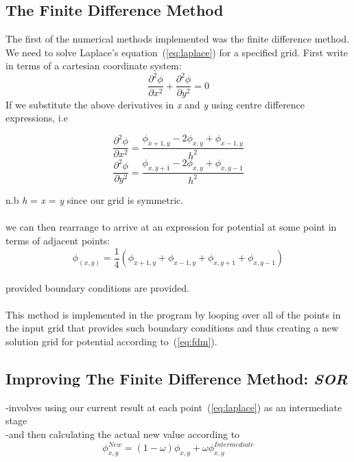 \documentclass{article}
\begin{document}
\subsection{The Finite Difference Method}
The first of the numerical methods implemented was the finite difference method. We need to solve Laplace's equation~(\ref{eq:laplace}) for a specified grid. First write in terms of a cartesian coordinate system:  
\begin{equation}
\frac{\partial^2\phi}{\partial x^2}+\frac{\partial^2\phi}{\partial y^2}=0
\label{eq:lapcart}
\end{equation}  
If we substitute the above derivatives in \textit{x} and \textit{y} using centre difference expressions, i.e
\begin{multicols}{2}
  \begin{equation}
\frac{\partial^2\phi}{\partial x^2} = \frac{\phi_{x+1,y}-2\phi_{x,y}+\phi_{x-1, y}}{h^2}
  \end{equation}\break
  \begin{equation}
\frac{\partial^2\phi}{\partial y^2} = \frac{\phi_{x,y+1}-2\phi_{x,y}+\phi_{x, y-1}}{h^2}
  \end{equation}
\end{multicols}
 n.b \textit{h} = \Delta\)\textit{x} = \Delta\textit{y}\) since our grid is symmetric.\\
\\
we can then rearrange to arrive at an expression for potential at some point in terms of adjacent points:
\begin{equation}
\phi_(x,y) = \frac{1}{4}(\phi_{x+1,y}+\phi_{x-1,y}+\phi_{x,y+1} + \phi_{x, y-1})
\label{eq:fdm}
\end{equation}
\\
provided boundary conditions are provided. \\
 \\
This method is implemented in the program by looping over all of the points in the input grid that provides such boundary conditions and thus creating a new solution grid for potential according to~(\ref{eq:fdm}). 

\subsection{Improving The Finite Difference Method: \textit{SOR}}
-involves using our current result at each point~(\ref{eq:laplace}) as an intermediate stage \\
-and then calculating the actual new value according to \\
\begin{equation}
\phi_{x,y}^{New} = (1-\omega)\phi_{x,y}+\omega\phi_{x,y}^{Intermediate}
\label{eq:sor}
\end{equation}
\end{document}
